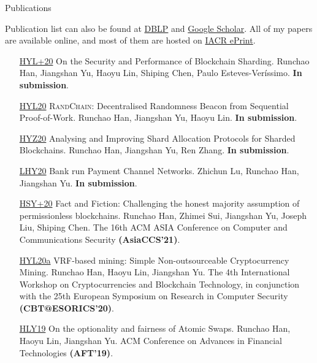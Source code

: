 \documentclass{resume} %
\begin{document}


\begin{rSection}{Publications}

    Publication list can also be found at \href{https://dblp.org/pers/hd/h/Han:Runchao}{DBLP} and \href{http://scholar.google.com/citations?user=xbpDocQAAAAJ&hl=en}{Google Scholar}.
    All of my papers are available online, and most of them are hosted on \href{https://eprint.iacr.org/}{IACR ePrint}.

    \begin{itemize}
        \item[\href{https://eprint.iacr.org/2020/1033}{HYL+20}] On the Security and Performance of Blockchain Sharding. Runchao Han, Jiangshan Yu, Haoyu Lin, Shiping Chen, Paulo Esteves-Veríssimo. \textbf{In submission}.
        \item[\href{https://eprint.iacr.org/2020/1033}{HYL20}] \textsc{RandChain}: Decentralised Randomness Beacon from Sequential Proof-of-Work. Runchao Han, Jiangshan Yu, Haoyu Lin. \textbf{In submission}.
        \item[\href{https://eprint.iacr.org/2020/943}{HYZ20}] Analysing and Improving Shard Allocation Protocols for Sharded Blockchains. Runchao Han, Jiangshan Yu, Ren Zhang. \textbf{In submission}.
        \item[\href{https://eprint.iacr.org/2020/456.pdf}{LHY20}] Bank run Payment Channel Networks. Zhichun Lu, Runchao Han, Jiangshan Yu. \textbf{In submission}.
        \item[\href{https://eprint.iacr.org/2019/752}{HSY+20}] Fact and Fiction: Challenging the honest majority assumption of permissionless blockchains. Runchao Han, Zhimei Sui, Jiangshan Yu, Joseph Liu, Shiping Chen. The 16th ACM ASIA Conference on Computer and Communications Security \textbf{(AsiaCCS'21)}.
        \item[\href{https://github.com/DEX-ware/vrf-mining/blob/master/paper/main.pdf}{HYL20a}] VRF-based mining: Simple Non-outsourceable Cryptocurrency Mining. Runchao Han, Haoyu Lin, Jiangshan Yu. The 4th International Workshop on Cryptocurrencies and Blockchain Technology, in conjunction with the 25th European Symposium on Research in Computer Security \textbf{(CBT@ESORICS'20)}.
        \item[\href{https://eprint.iacr.org/2019/896}{HLY19}] On the optionality and fairness of Atomic Swaps. Runchao Han, Haoyu Lin, Jiangshan Yu.  ACM Conference on Advances in Financial Technologies \textbf{(AFT'19)}.

\end{itemize}
\end{rSection}
\end{document}
